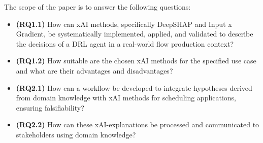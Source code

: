 The scope of the paper is to answer the following questions:
\begin{itemize}
    \item \textbf{(RQ1.1)} How can xAI methods, specifically DeepSHAP and Input x Gradient, be systematically implemented, applied, and validated to describe the decisions of a DRL agent in a real-world flow production context?
    \item \textbf{(RQ1.2)} How suitable are the chosen xAI methods for the specified use case and what are their advantages and disadvantages?
    \item \textbf{(RQ2.1)} How can a workflow be developed to integrate hypotheses derived from domain knowledge with xAI methods for scheduling applications, ensuring falsifiability?
    \item \textbf{(RQ2.2)} How can these xAI-explanations be processed and communicated to stakeholders using domain knowledge?
\end{itemize}